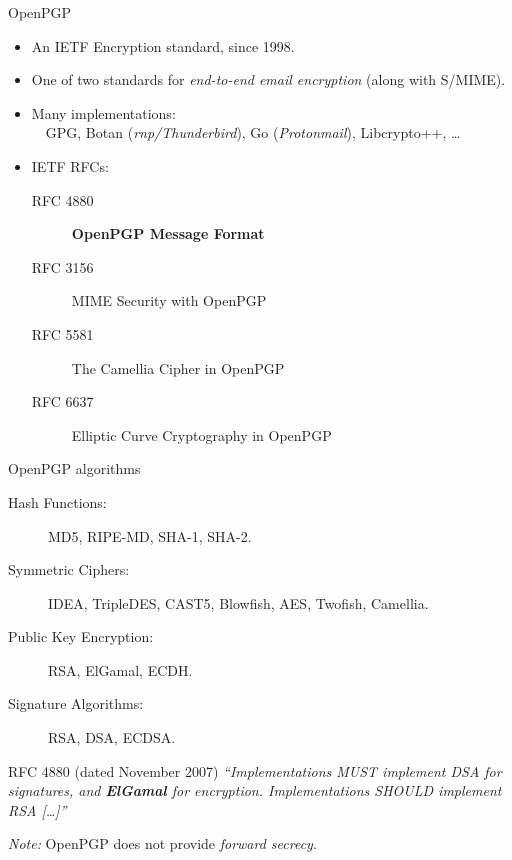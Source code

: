 \documentclass[aspectratio=169]{beamer}
\begin{document}
\begin{frame}{OpenPGP}
  \large
  \begin{itemize}
    \setlength{\itemsep}{1em}
  \item An IETF Encryption standard, since 1998.
  \item One of two standards for \emph{end-to-end email encryption}
    (along with S/MIME).
  \item Many implementations:\\
    ~~GPG, Botan (\emph{rnp/Thunderbird}), Go
    (\emph{Protonmail}), Libcrypto++, \dots
  \item IETF RFCs:
    \begin{description}
    \item[RFC 4880 ] \textbf{OpenPGP Message Format}
    \item[RFC 3156 ] MIME Security with OpenPGP
    \item[RFC 5581 ] The Camellia Cipher in OpenPGP
    \item[RFC 6637 ] Elliptic Curve Cryptography in OpenPGP
    \end{description}
  \end{itemize}
\end{frame}


\begin{frame}{OpenPGP algorithms}
  \large
  \begin{description}
  \item[Hash Functions:] MD5, RIPE-MD, SHA-1, SHA-2.
  \item[Symmetric Ciphers:] IDEA, TripleDES, CAST5, Blowfish, AES,
    Twofish, Camellia.
  \item[Public Key Encryption:] RSA, ElGamal, ECDH.
  \item[Signature Algorithms:] RSA, DSA, ECDSA.
  \end{description}

  \bigskip
  
  \begin{block}{RFC 4880 \small(dated November 2007)}
    \it ``Implementations MUST implement DSA for signatures, and
    \textbf{ElGamal} for encryption. Implementations SHOULD implement
    RSA [\dots]''
  \end{block}

  \bigskip
  
  \emph{Note:} OpenPGP does not provide \emph{forward secrecy}.
\end{frame}

\end{document}
